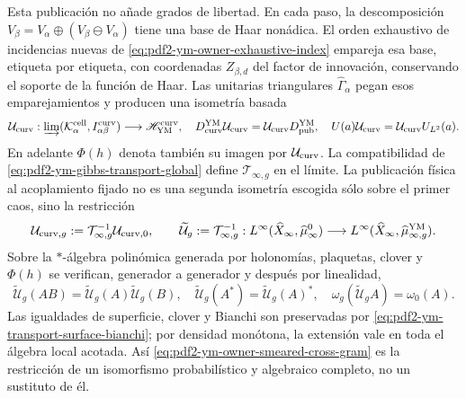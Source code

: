 Esta publicación no añade grados de libertad. En cada paso, la descomposición
$V_\beta=V_\alpha\oplus(V_\beta\ominus V_\alpha)$ tiene una base de Haar
nonádica. El orden exhaustivo de incidencias nuevas de
\eqref{eq:pdf2-ym-owner-exhaustive-index} empareja esa base, etiqueta por etiqueta,
con coordenadas $Z_{\beta,d}$ del factor de innovación, conservando el soporte de la
función de Haar. Las unitarias triangulares $\widehat\Gamma_\alpha$ pegan esos
emparejamientos y producen una isometría basada
\begin{equation}\label{eq:pdf2-ym-owner-publication-into-physical}
 \mathcal U_{\rm curv}:
 \varinjlim(\mathcal K_\alpha^{\rm cell},I_{\alpha\beta}^{\rm curv})
 \longrightarrow\mathscr H_{\rm YM}^{\rm curv},
 \quad
 D_{\rm curv}^{\rm YM}\mathcal U_{\rm curv}
 =\mathcal U_{\rm curv}D_{\rm pub}^{\rm YM},
 \quad U(a)\mathcal U_{\rm curv}=\mathcal U_{\rm curv}U_{L^2}(a).
\end{equation}
En adelante $\Phi(h)$ denota también su imagen por $\mathcal U_{\rm curv}$.
La compatibilidad de \eqref{eq:pdf2-ym-gibbs-transport-global} define
$\mathcal T_{\infty,g}$ en el límite. La publicación física al acoplamiento fijado
no es una segunda isometría escogida sólo sobre el primer caos, sino la restricción
\begin{equation}\label{eq:pdf2-ym-full-publication-restriction}
 \mathcal U_{{\rm curv},g}
 :=\mathcal T_{\infty,g}^{-1}\mathcal U_{{\rm curv},0},
 \qquad
 \widetilde{\mathcal U}_g
 :=\mathcal T_{\infty,g}^{-1}:
 L^\infty(\widehat X_\infty,\widehat\mu_\infty^0)
 \longrightarrow
 L^\infty(\widehat X_\infty,\widehat\mu_{\infty,g}^{\rm YM}).
\end{equation}
Sobre la $*$-álgebra polinómica generada por holonomías, plaquetas, clover y
$\Phi(h)$ se verifican, generador a generador y después por linealidad,
\begin{equation}\label{eq:pdf2-ym-full-publication-products}
 \widetilde{\mathcal U}_g(AB)
 =\widetilde{\mathcal U}_g(A)\widetilde{\mathcal U}_g(B),
 \quad
 \widetilde{\mathcal U}_g(A^*)=\widetilde{\mathcal U}_g(A)^*,
 \quad
 \omega_g(\widetilde{\mathcal U}_gA)=\omega_0(A).
\end{equation}
Las igualdades de superficie, clover y Bianchi son preservadas por
\eqref{eq:pdf2-ym-transport-surface-bianchi}; por densidad monótona, la extensión
vale en toda el álgebra local acotada. Así
\eqref{eq:pdf2-ym-owner-smeared-cross-gram} es la restricción de un isomorfismo
probabilístico y algebraico completo, no un sustituto de él.

